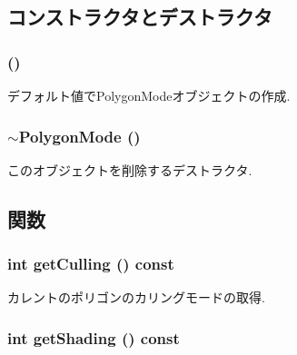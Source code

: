 \subsection{コンストラクタとデストラクタ}
\hypertarget{classm3g_1_1PolygonMode_b089ee808cbc4799bb2e92dd4ca554c3}{
\subsubsection[{PolygonMode}]{ ()}}
\label{classm3g_1_1PolygonMode_b089ee808cbc4799bb2e92dd4ca554c3}


デフォルト値でPolygonModeオブジェクトの作成. \hypertarget{classm3g_1_1PolygonMode_64ea3958d7ec67fc648707782b2221fe}{
\subsubsection[{$\sim$PolygonMode}]{\setlength{\rightskip}{0pt plus 5cm}$\sim${\bf PolygonMode} ()}}
\label{classm3g_1_1PolygonMode_64ea3958d7ec67fc648707782b2221fe}


このオブジェクトを削除するデストラクタ. 

\subsection{関数}
\hypertarget{classm3g_1_1PolygonMode_3b0c0325e93774222d828f2612d59b1b}{
\subsubsection[{getCulling}]{\setlength{\rightskip}{0pt plus 5cm}int getCulling () const}}
\label{classm3g_1_1PolygonMode_3b0c0325e93774222d828f2612d59b1b}


カレントのポリゴンのカリングモードの取得. \hypertarget{classm3g_1_1PolygonMode_c09a62f099e07df16a8c21f997b9f6a6}{
\subsubsection[{getShading}]{\setlength{\rightskip}{0pt plus 5cm}int getShading () const}}
\label{classm3g_1_1PolygonMode_c09a62f099e07df16a8c21f997b9f6a6}


